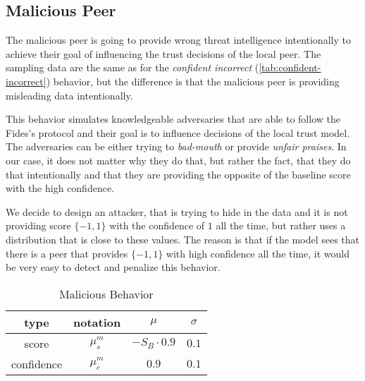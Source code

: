 \subsection{Malicious Peer}
\label{subsubsec:malicious-peer}
The malicious peer is going to provide wrong threat intelligence intentionally to achieve their goal of influencing the trust decisions of the local peer. 
The sampling data are the same as for the \textit{confident incorrect} (\ref{tab:confident-incorrect}) behavior, but the difference is that the malicious peer is providing misleading data intentionally.

This behavior simulates knowledgeable adversaries that are able to follow the Fides's protocol and their goal is to influence decisions of the local trust model.
The adversaries can be either trying to \textit{bad-mouth} or provide \textit{unfair praises}.
In our case, it does not matter why they do that, but rather the fact, that they do that intentionally and that they are providing the opposite of the baseline score with the high confidence.

We decide to design an attacker, that is trying to hide in the data and it is not providing score $\{-1, 1\}$ with the confidence of $1$ all the time, but rather uses a distribution that is close to these values.
The reason is that if the model sees that there is a peer that provides $\{-1, 1\}$ with high confidence all the time, it would be very easy to detect and penalize this behavior.

\begin{table}[!ht]
    \centering
    \begin{tabular}{c|c|c|c}
        type & notation & $\mu$ & $\sigma$ \\
        \hline
        score & $\mu^{m}_{s}$ & $-S_{B} \cdot 0.9$ & $0.1$ \\
        confidence & $\mu^{m}_{c}$ &  $0.9$ & $0.1$ \\
    \end{tabular}
    \caption{Malicious Behavior}
    \label{tab:malicious-peer}
\end{table}

